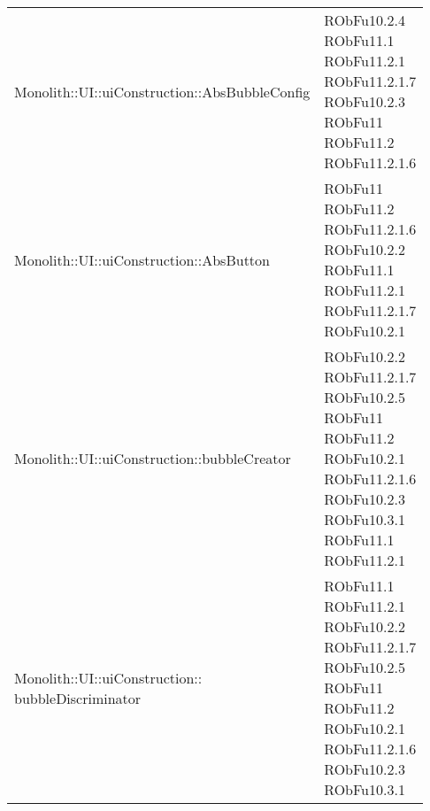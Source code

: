 \begin{center}
\begin{longtable}{|
*{1}{>{\centering\arraybackslash}m{7.5cm}|}
*{1}{>{\centering\arraybackslash}m{2.5cm}|}}
{\\RObFu11.2.1.7
\\}\\\hline
Monolith::UI::uiConstruction::AbsBubbleConfig & \makecell{RObFu10.2.4
\\RObFu11.1
\\RObFu11.2.1
\\RObFu11.2.1.7
\\RObFu10.2.3
\\RObFu11
\\RObFu11.2
\\RObFu11.2.1.6
\\}\\\hline
Monolith::UI::uiConstruction::AbsButton & \makecell{RObFu11
\\RObFu11.2
\\RObFu11.2.1.6
\\RObFu10.2.2
\\RObFu11.1
\\RObFu11.2.1
\\RObFu11.2.1.7
\\RObFu10.2.1
\\}\\\hline
Monolith::UI::uiConstruction::bubbleCreator & \makecell{RObFu10.2.2
\\RObFu11.2.1.7
\\RObFu10.2.5
\\RObFu11
\\RObFu11.2
\\RObFu10.2.1
\\RObFu11.2.1.6
\\RObFu10.2.3
\\RObFu10.3.1
\\RObFu11.1
\\RObFu11.2.1
\\}\\\hline
\makecell[l]{Monolith::UI::uiConstruction:: \\ \hfill bubbleDiscriminator} & \makecell{RObFu11.1
\\RObFu11.2.1
\\RObFu10.2.2
\\RObFu11.2.1.7
\\RObFu10.2.5
\\RObFu11
\\RObFu11.2
\\RObFu10.2.1
\\RObFu11.2.1.6
\\RObFu10.2.3
\\RObFu10.3.1
\\}\\\hline

\end{longtable}
\end{center}
